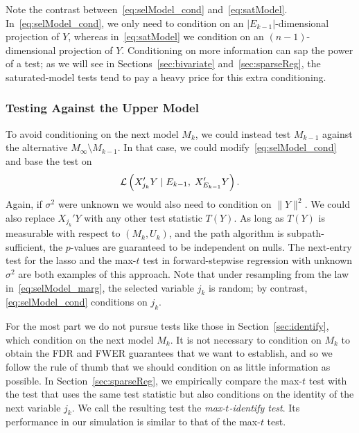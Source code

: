 \documentclass{article}
\begin{document}
Note the contrast between~\eqref{eq:selModel_cond} and~\eqref{eq:satModel}. In~\eqref{eq:selModel_cond}, we only need to condition on an $|E_{k-1}|$-dimensional projection of $Y$, whereas in~\eqref{eq:satModel} we condition on an $(n-1)$-dimensional projection of $Y$. Conditioning on more information can sap the power of a test; as we will see in Sections~\ref{sec:bivariate} and~\ref{sec:sparseReg}, the saturated-model tests tend to pay a heavy price for this extra conditioning.

\subsubsection{Testing Against the Upper Model}


To avoid conditioning on the next model $M_k$, we could instead test $M_{k-1}$ against the alternative $M_{\infty}\setminus M_{k-1}$. In that case, we could modify~\eqref{eq:selModel_cond} and base the test on
\begin{equation}\label{eq:selModel_marg}
\mathcal{L}\left(X_{j_k}'Y \mid E_{k-1}, \; X_{E_{k-1}}'Y\right).
\end{equation}
Again, if $\sigma^2$ were unknown we would also need to condition on $\|Y\|^2$. We could also replace $X_{j_k}'Y$ with any other test statistic $T(Y)$. As long as $T(Y)$ is measurable with respect to $(M_k, U_k)$, and the path algorithm is subpath-sufficient, the $p$-values are guaranteed to be independent on nulls. The next-entry test for the lasso and the max-$t$ test in forward-stepwise regression with unknown $\sigma^2$ are both examples of this approach. Note that under resampling from the law in~\eqref{eq:selModel_marg}, the selected variable $j_k$ is random; by contrast, \eqref{eq:selModel_cond} conditions on $j_k$.


For the most part we do not pursue tests like those in Section~\ref{sec:identify}, which condition on the next model $M_k$. It is not necessary to condition on $M_k$ to obtain the FDR and FWER guarantees that we want to establish, and so we follow the rule of thumb that we should condition on as little information as possible. In Section~\ref{sec:sparseReg}, we empirically compare the max-$t$ test with the test that uses the same test statistic but also conditions on the identity of the next variable $j_k$. We call the resulting test the {\em max-$t$-identify test}. Its performance in our simulation is similar to that of the max-$t$ test.
\end{document}
